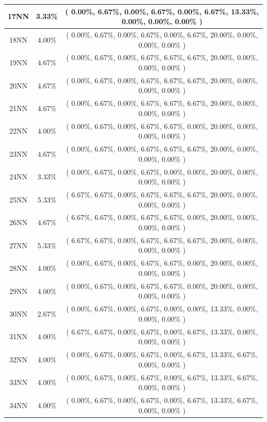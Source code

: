 \documentclass[11pt,a4paper]{article}
\begin{document}
\begin{center}
\begin{tabular} {|| c | c | c ||}
17NN & 3.33\% & ( 0.00\%, 6.67\%, 0.00\%, 6.67\%, 0.00\%, 6.67\%, 13.33\%, 0.00\%, 0.00\%, 0.00\% ) \\ \hline
18NN & 4.00\% & ( 0.00\%, 6.67\%, 0.00\%, 6.67\%, 0.00\%, 6.67\%, 20.00\%, 0.00\%, 0.00\%, 0.00\% ) \\ \hline
19NN & 4.67\% & ( 0.00\%, 6.67\%, 0.00\%, 6.67\%, 6.67\%, 6.67\%, 20.00\%, 0.00\%, 0.00\%, 0.00\% ) \\ \hline
20NN & 4.67\% & ( 0.00\%, 6.67\%, 0.00\%, 6.67\%, 6.67\%, 6.67\%, 20.00\%, 0.00\%, 0.00\%, 0.00\% ) \\ \hline
21NN & 4.67\% & ( 0.00\%, 6.67\%, 0.00\%, 6.67\%, 6.67\%, 6.67\%, 20.00\%, 0.00\%, 0.00\%, 0.00\% ) \\ \hline
22NN & 4.00\% & ( 0.00\%, 6.67\%, 0.00\%, 6.67\%, 6.67\%, 0.00\%, 20.00\%, 0.00\%, 0.00\%, 0.00\% ) \\ \hline
23NN & 4.67\% & ( 0.00\%, 6.67\%, 0.00\%, 6.67\%, 6.67\%, 6.67\%, 20.00\%, 0.00\%, 0.00\%, 0.00\% ) \\ \hline
24NN & 3.33\% & ( 0.00\%, 6.67\%, 0.00\%, 6.67\%, 0.00\%, 0.00\%, 20.00\%, 0.00\%, 0.00\%, 0.00\% ) \\ \hline
25NN & 5.33\% & ( 6.67\%, 6.67\%, 0.00\%, 6.67\%, 6.67\%, 6.67\%, 20.00\%, 0.00\%, 0.00\%, 0.00\% ) \\ \hline
26NN & 4.67\% & ( 6.67\%, 6.67\%, 0.00\%, 6.67\%, 6.67\%, 0.00\%, 20.00\%, 0.00\%, 0.00\%, 0.00\% ) \\ \hline
27NN & 5.33\% & ( 6.67\%, 6.67\%, 0.00\%, 6.67\%, 6.67\%, 6.67\%, 20.00\%, 0.00\%, 0.00\%, 0.00\% ) \\ \hline
28NN & 4.00\% & ( 0.00\%, 6.67\%, 0.00\%, 6.67\%, 6.67\%, 0.00\%, 20.00\%, 0.00\%, 0.00\%, 0.00\% ) \\ \hline
29NN & 4.00\% & ( 0.00\%, 6.67\%, 0.00\%, 6.67\%, 6.67\%, 0.00\%, 20.00\%, 0.00\%, 0.00\%, 0.00\% ) \\ \hline
30NN & 2.67\% & ( 0.00\%, 6.67\%, 0.00\%, 6.67\%, 0.00\%, 0.00\%, 13.33\%, 0.00\%, 0.00\%, 0.00\% ) \\ \hline
31NN & 4.00\% & ( 6.67\%, 6.67\%, 0.00\%, 6.67\%, 0.00\%, 6.67\%, 13.33\%, 0.00\%, 0.00\%, 0.00\% ) \\ \hline
32NN & 4.00\% & ( 0.00\%, 6.67\%, 0.00\%, 6.67\%, 0.00\%, 6.67\%, 13.33\%, 6.67\%, 0.00\%, 0.00\% ) \\ \hline
33NN & 4.00\% & ( 0.00\%, 6.67\%, 0.00\%, 6.67\%, 0.00\%, 6.67\%, 13.33\%, 6.67\%, 0.00\%, 0.00\% ) \\ \hline
34NN & 4.00\% & ( 0.00\%, 6.67\%, 0.00\%, 6.67\%, 0.00\%, 6.67\%, 13.33\%, 6.67\%, 0.00\%, 0.00\% ) \\ \hline

\end{tabular}
\end{center}
\end{document}

